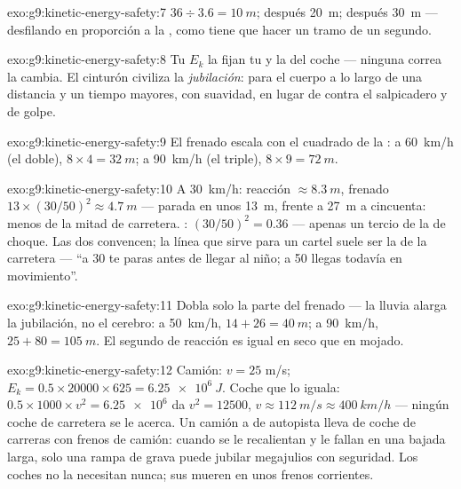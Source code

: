 \begin{solution}{exo:g9:kinetic-energy-safety:7}
$36 \div 3.6 = \qty{10}{m}$; después \qty{20}{m}; después
\qty{30}{m} --- desfilando en proporción a la , como
tiene que hacer un tramo de un segundo.
\end{solution}

\begin{solution}{exo:g9:kinetic-energy-safety:8}
Tu $E_k$ la fijan tu  y la  del coche ---
ninguna correa la cambia. El cinturón civiliza la
\emph{jubilación}: para el cuerpo a lo largo de una distancia y un
tiempo mayores, con suavidad, en lugar de contra el salpicadero y de
golpe.
\end{solution}

\begin{solution}{exo:g9:kinetic-energy-safety:9}
El frenado escala con el cuadrado de la : a
\qty{60}{km/h} (el doble), $8 \times 4 = \qty{32}{m}$; a
\qty{90}{km/h} (el triple), $8 \times 9 = \qty{72}{m}$.
\end{solution}

\begin{solution}{exo:g9:kinetic-energy-safety:10}
A \qty{30}{km/h}: reacción $\approx \qty{8.3}{m}$, frenado $13 \times
(30/50)^2 \approx \qty{4.7}{m}$ --- parada en unos \qty{13}{m}, frente
a \qty{27}{m} a cincuenta: menos de la mitad de carretera. :
$(30/50)^2 = 0.36$ --- apenas un tercio de la  de choque.
Las dos convencen; la línea que sirve para un cartel suele ser la de la
carretera --- ``a 30 te paras antes de llegar al niño; a 50 llegas
todavía en movimiento''.
\end{solution}

\begin{solution}{exo:g9:kinetic-energy-safety:11}
Dobla solo la parte del frenado --- la lluvia alarga la jubilación, no
el cerebro: a \qty{50}{km/h}, $14 + 26 = \qty{40}{m}$; a
\qty{90}{km/h}, $25 + 80 = \qty{105}{m}$. El segundo de reacción es
igual en seco que en mojado.
\end{solution}

\begin{solution}{exo:g9:kinetic-energy-safety:12}
Camión: $v = 25$ \unit{m/s}; $E_k = 0.5 \times 20000 \times 625 =
\qty{6.25e6}{J}$. Coche que lo iguala: $0.5 \times 1000 \times v^2 =
\num{6.25e6}$ da $v^2 = 12500$, $v \approx \qty{112}{m/s} \approx
\qty{400}{km/h}$ --- ningún coche de carretera se le acerca. Un camión
a  de autopista lleva  de coche de carreras con
frenos de camión: cuando se le recalientan y le fallan en una bajada
larga, solo una rampa de grava puede jubilar megajulios con seguridad.
Los coches no la necesitan nunca; sus  mueren en unos frenos
corrientes.
\end{solution}

